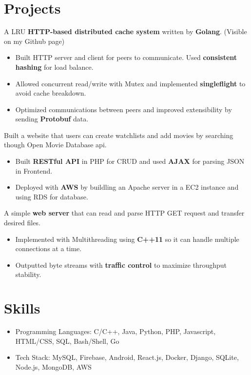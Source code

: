 \documentclass{resume}
\begin{document}
\section{Projects}
 {}
  A LRU \textbf{HTTP-based distributed cache system} written by \textbf{Golang}. (Visible on my Github page)
\begin{itemize}
  \item Built HTTP server and client for peers to communicate. Used \textbf{consistent hashing} for load balance.
  \item Allowed concurrent read/write with Mutex and implemented \textbf{singleflight} to avoid cache breakdown.
  \item Optimized communications between peers and improved extensibility by sending \textbf{Protobuf} data.
\end{itemize}

 {}
  Built a website that users can create watchlists and add movies by searching though Open Movie Database api.
\begin{itemize}
  \item Built \textbf{RESTful API} in PHP for CRUD and used \textbf{AJAX} for parsing JSON in Frontend.
  \item Deployed with \textbf{AWS} by buildling an Apache server in a EC2 instance and using RDS for database.
\end{itemize}

 {}
  A simple \textbf{web server} that can read and parse HTTP GET request and transfer desired files.
\begin{itemize}
  \item Implemented with Multithreading using \textbf{C++11} so it can handle multiple connections at a time.
  \item Outputted byte streams with \textbf{traffic control} to maximize throughput stability.
\end{itemize}

\section{Skills}
\begin{itemize}[parsep=0.5ex]
  \item Programming Languages: C/C++, Java, Python, PHP, Javascript, HTML/CSS, SQL, Bash/Shell, Go
  \item Tech Stack: MySQL, Firebase, Android, React.js, Docker, Django, SQLite, Node.js, MongoDB, AWS
\end{itemize}
\end{document}
